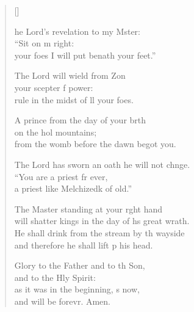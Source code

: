 \settowidth{\versewidth}{will shatter kings in the day of his great wrath.}
\begin{verse}[\versewidth]
  \begin{patverse}
he Lord’s revelation to my Mster:\Flex\\
“Sit on m right:\Med\\
your foes I will put benath your feet.”

The Lord will wield from Z\pointup{\i}on\Flex\\
your scepter f power:\Med\\
rule in the midst of ll your foes.

A prince from the day of your b\pointup{\i}rth\Flex\\
on the hol mountains;\Med\\
from the womb before the dawn  begot you.

The Lord has sworn an oath he will not chnge.\Flex\\
“You are a priest fr ever,\Med\\
a priest like Melchizedk of old.”

The Master standing at your r\pointup{\i}ght hand\Med\\
will shatter kings in the day of h\pointup{\i}s great wrath.\\
He shall drink from the stream by th wayside\Med\\
and therefore he shall lift p his head.

Glory to the Father and to th Son,\Med\\
and to the Hly Spirit:\\
as it was in the beginning, \pointup{\i}s now,\Med\\
and will be forevr. Amen.
  \end{patverse}
\end{verse}
